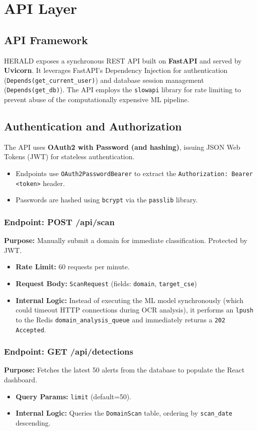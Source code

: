\documentclass[12pt,a4paper]{report}
\begin{document}
\chapter{API Layer}
\section{API Framework}
HERALD exposes a synchronous REST API built on \textbf{FastAPI} and served by \textbf{Uvicorn}. It leverages FastAPI's Dependency Injection for authentication (\texttt{Depends(get\_current\_user)}) and database session management (\texttt{Depends(get\_db)}). The API employs the \texttt{slowapi} library for rate limiting to prevent abuse of the computationally expensive ML pipeline.

\section{Authentication and Authorization}
The API uses \textbf{OAuth2 with Password (and hashing)}, issuing JSON Web Tokens (JWT) for stateless authentication.
\begin{itemize}
\item Endpoints use \texttt{OAuth2PasswordBearer} to extract the \texttt{Authorization: Bearer <token>} header.
\item Passwords are hashed using \texttt{bcrypt} via the \texttt{passlib} library.
\end{itemize}

\subsection{Endpoint: POST /api/scan}
\textbf{Purpose:} Manually submit a domain for immediate classification. Protected by JWT.
\begin{itemize}
\item \textbf{Rate Limit:} 60 requests per minute.
\item \textbf{Request Body:} \texttt{ScanRequest} (fields: \texttt{domain}, \texttt{target\_cse})
\item \textbf{Internal Logic:} Instead of executing the ML model synchronously (which could timeout HTTP connections during OCR analysis), it performs an \texttt{lpush} to the Redis \texttt{domain\_analysis\_queue} and immediately returns a \texttt{202 Accepted}.
\end{itemize}

\subsection{Endpoint: GET /api/detections}
\textbf{Purpose:} Fetches the latest 50 alerts from the database to populate the React dashboard.
\begin{itemize}
\item \textbf{Query Params:} \texttt{limit} (default=50).
\item \textbf{Internal Logic:} Queries the \texttt{DomainScan} table, ordering by \texttt{scan\_date} descending.
\end{itemize}
\end{document}
